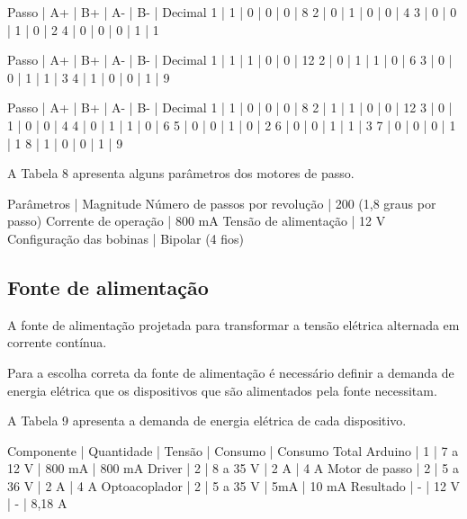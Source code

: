 
Passo | A+ | B+ | A- | B- | Decimal
1 | 1 | 0 | 0 | 0 | 8
2 | 0 | 1 | 0 | 0 | 4
3 | 0 | 0 | 1 | 0 | 2
4 | 0 | 0 | 0 | 1 | 1


Passo | A+ | B+ | A- | B- | Decimal
1 | 1 | 1 | 0 | 0 | 12
2 | 0 | 1 | 1 | 0 | 6
3 | 0 | 0 | 1 | 1 | 3
4 | 1 | 0 | 0 | 1 | 9


Passo | A+ | B+ | A- | B- | Decimal
1 | 1 | 0 | 0 | 0 | 8
2 | 1 | 1 | 0 | 0 | 12
3 | 0 | 1 | 0 | 0 | 4
4 | 0 | 1 | 1 | 0 | 6
5 | 0 | 0 | 1 | 0 | 2
6 | 0 | 0 | 1 | 1 | 3
7 | 0 | 0 | 0 | 1 | 1
8 | 1 | 0 | 0 | 1 | 9

A Tabela 8 apresenta alguns parâmetros dos motores de passo.


Parâmetros | Magnitude
Número de passos por revolução | 200 (1,8 graus por passo)
Corrente de operação | 800 mA
Tensão de alimentação | 12 V
Configuração das bobinas | Bipolar (4 fios)

\subsection{Fonte de alimentação}

A fonte de alimentação projetada para transformar a tensão elétrica alternada em corrente contínua.

Para a escolha correta da fonte de alimentação é necessário definir a demanda de energia elétrica 
que os dispositivos que são alimentados pela fonte necessitam.

A Tabela 9 apresenta a demanda de energia elétrica de cada dispositivo.


Componente | Quantidade | Tensão | Consumo | Consumo Total
Arduino | 1 | 7 a 12 V | 800 mA | 800 mA
Driver | 2 | 8 a 35 V | 2 A | 4 A
Motor de passo | 2 | 5 a 36 V | 2 A | 4 A
Optoacoplador | 2 | 5 a 35 V | 5mA | 10 mA
Resultado | - | 12 V | - | 8,18 A

